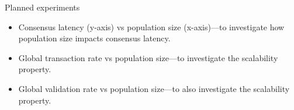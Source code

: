 \documentclass{beamer}
\begin{document}
\begin{frame}{Planned experiments}
  \begin{itemize}
    \item Consensus latency (y-axis) vs population size (x-axis)---to
      investigate how population size impacts consensus latency.
    \item Global transaction rate vs population size---to investigate
      the scalability property.
    \item Global validation rate vs population size---to also investigate the
      scalability property.
  \end{itemize}
\end{frame}
\end{document}
